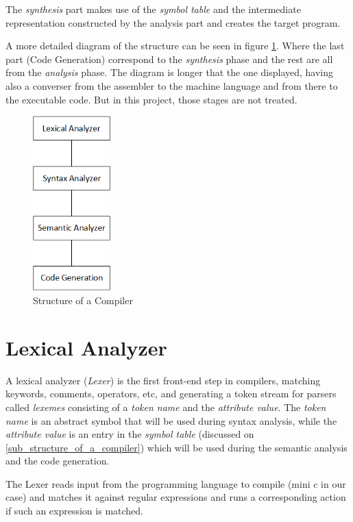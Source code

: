 \documentclass[conference]{IEEEtran}
\theoremstyle{definition}
\begin{document}
The \textit{synthesis} part makes use of the \textit{symbol table} and the intermediate representation constructed by the analysis part and creates the target program.

A more detailed diagram of the structure can be seen in figure \ref{fig_struct_of_compilator}. Where the last part (Code Generation) correspond to the \textit{synthesis} phase and the rest are all from the \textit{analysis} phase. The diagram is longer that the one displayed, having also a converser from the assembler to the machine language and from there to the executable code. But in this project, those stages are not treated.

\begin{figure}[H]
\centering
\includegraphics[width=3cm]{images/Diagram.png}
\caption{Structure of a Compiler}
\label{fig_struct_of_compilator}
\end{figure}

\section{Lexical Analyzer} \label{sec:lexical-Analizer}
A lexical analyzer (\textit{Lexer}) is the first front-end step in compilers, matching keywords, comments, operators, etc, and generating a token stream for parsers called \textit{lexemes} consisting of a \textit{token name} and the \textit{attribute value}. 
The \textit{token name} is an abstract symbol that will be used during syntax analysis, while the \textit{attribute value} is an entry in the \textit{symbol table} (discussed on \ref{sub_structure_of_a_compiler}) which will be used during the semantic analysis and the code generation.

The Lexer reads input from the programming language to compile (mini c in our case) and matches it against regular expressions and runs a corresponding action if such an expression is matched.
\end{document}
